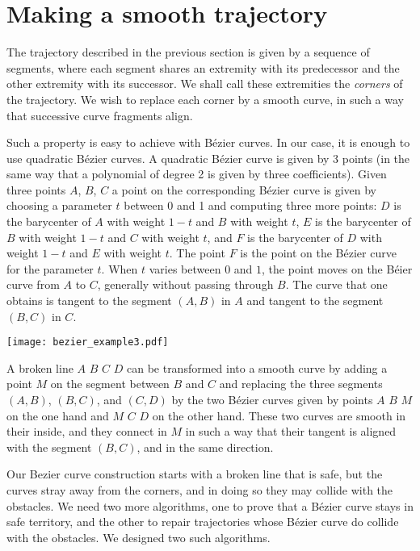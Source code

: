 \documentclass{easychair}
\begin{document}
\section{Making a smooth trajectory}
The trajectory described in the previous section is given by a
sequence of segments, where each segment shares an extremity with its
predecessor and the other extremity with its successor.  We shall call
these extremities the {\em corners} of the trajectory.  We wish to
replace each corner by a smooth curve, in such a way that successive
curve fragments align.

Such a property is easy to achieve with Bézier curves.  In our case,
it is enough to use quadratic Bézier curves.  A quadratic Bézier curve
is given by 3 points (in the same way that a polynomial of degree 2 is
given by three coefficients).  Given three points \(A\), \(B\), \(C\)
a point on the corresponding Bézier curve is given by choosing a
parameter \(t\) between 0 and 1 and computing three more points:
\(D\) is the barycenter of \(A\) with weight \(1 - t\) and \(B\) with
weight \(t\), \(E\) is the barycenter of \(B\) with weight \(1 - t\)
and \(C\) with weight \(t\), and \(F\) is the barycenter of \(D\) with
weight \(1-t\) and \(E\) with weight \(t\).  The point \(F\) is the
point on the Bézier curve for the parameter \(t\).  When \(t\) varies
between \(0\) and \(1\), the point moves on the Béier curve from \(A\)
to \(C\), generally without passing through \(B\).  The curve that one
obtains is tangent to the segment \((A,B)\) in \(A\) and tangent to
the segment \((B,C)\) in \(C\).

\begin{center}
\texttt{[image: bezier\_example3.pdf]}
\end{center}


A broken line \(A\) \(B\) \(C\) \(D\) can be transformed into a smooth
curve by adding a point \(M\) on the segment between \(B\) and \(C\)
and replacing the three segments \((A, B)\), \((B, C)\), and \((C,
D)\) by the two Bézier curves given by points \(A\) \(B\) \(M\) on the
one hand and \(M\) \(C\) \(D\) on the other hand.  These two curves
are smooth in their inside, and they connect in \(M\) in such a way
that their tangent is aligned with the segment \((B, C)\), and in the
same direction.

Our Bezier curve construction starts with a broken line that is safe,
but the curves stray away from the corners, and in doing so they may
collide with the obstacles.  We need two more algorithms, one to prove
that a Bézier curve stays in safe territory, and the other to repair
trajectories whose Bézier curve do collide with the obstacles.  We
designed two such algorithms.
\end{document}
